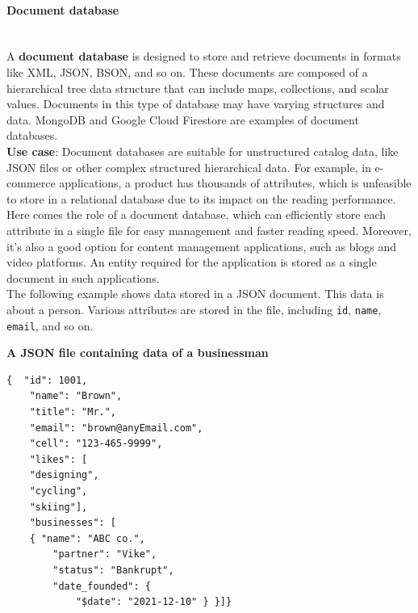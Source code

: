 \paragraph{Document database}\label{El9Tuq5s7GuhIj3kySbjQ}
\\
A \textbf{document database} is designed to store and retrieve documents in formats like XML, JSON, BSON, and so on. These documents are composed of a hierarchical tree data structure that can include maps, collections, and scalar values. Documents in this type of database may have varying structures and data. MongoDB and Google Cloud Firestore are examples of document databases.
\\
\textbf{Use case}: Document databases are suitable for unstructured catalog data, like JSON files or other complex structured hierarchical data. For example, in e-commerce applications, a product has thousands of attributes, which is unfeasible to store in a relational database due to its impact on the reading performance. Here comes the role of a document database, which can efficiently store each attribute in a single file for easy management and faster reading speed. Moreover, it's also a good option for content management applications, such as blogs and video platforms. An entity required for the application is stored as a single document in such applications.
\\
The following example shows data stored in a JSON document. This data is about a person. Various attributes are stored in the file, including \texttt{id}, \texttt{name}, \texttt{email}, and so on.

\textbf{A JSON file containing data of a businessman}

\begin{lstlisting}[language=XML]
{  "id": 1001,
	"name": "Brown",
	"title": "Mr.",
	"email": "brown@anyEmail.com",
	"cell": "123-465-9999",
	"likes": [
	"designing",
	"cycling",
	"skiing"],
	"businesses": [
	{ "name": "ABC co.",
		"partner": "Vike",
		"status": "Bankrupt",
		"date_founded": {
			"$date": "2021-12-10" } }]}
\end{lstlisting}

